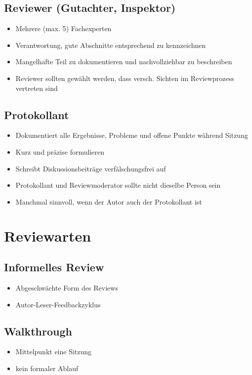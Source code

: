 \documentclass{report}
\theoremstyle{definition}
\theoremstyle{example}
\begin{document}
\subsection{Reviewer (Gutachter, Inspektor)}
\begin{itemize}
   \item Mehrere (max. 5) Fachexperten
   \item Verantwortung, gute Abschnitte entsprechend zu kennzeichnen
   \item Mangelhafte Teil zu dokumentieren und nachvollziehbar zu beschreiben
   \item Reviewer sollten gewählt werden, dass versch. Sichten im Reviewprozess vertreten sind
\end{itemize}

\subsection{Protokollant}
\begin{itemize}
   \item Dokumentiert alle Ergebnisse, Probleme und offene Punkte während Sitzung
   \item Kurz und präzise formulieren
   \item Schreibt Diskussionsbeiträge verfälschungsfrei auf
   \item Protokollant und Reviewmoderator sollte nicht dieselbe Person sein
   \item Manchmal sinnvoll, wenn der Autor auch der Protokollant ist
\end{itemize}

\section{Reviewarten}

\subsection{Informelles Review}
\begin{itemize}
   \item Abgeschwächte Form des Reviews
   \item Autor-Leser-Feedbackzyklus
\end{itemize}

\subsection{Walkthrough}
\begin{itemize}
   \item Mittelpunkt eine Sitzung
   \item kein formaler Ablauf
\end{itemize}
\end{document}

